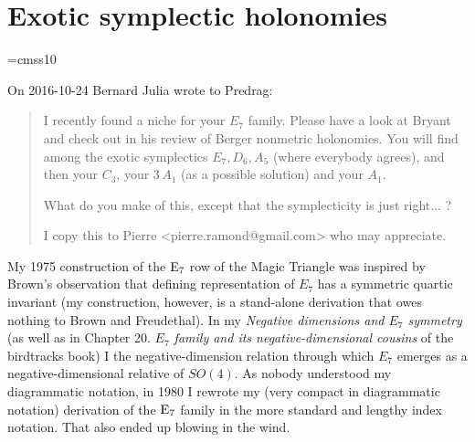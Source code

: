 

\chapter{Exotic symplectic holonomies}
\label{c-holonomies}

\def\Lam{\hbox{\sans\char3}}%
\def\Sym{\hbox{\sans S}}
\def\SO{{\rm SO}}\def\SL{{\rm SL}}
\def\Sp{{\rm Sp}}\def\SU{{\rm SU}}
\def\CO{{\rm CO}}\def\GL{{\rm GL}}
\def\Spin{{\rm Spin}}\def\U{{\rm U}}
\def\A{{\rm A}}\def\C{{\rm C}}\def\D{{\rm D}}
\def\E{{\rm E}}\def\O{{\rm O}}
\def\Diff{{\rm Diff}}\def\G{{\rm G}}
\def\bbC{{\Bbb C}}
\def\bbF{{\Bbb F}}
\def\bbH{{\Bbb H}}
\font\sans=cmss10



On 2016-10-24 Bernard Julia wrote to Predrag:
\begin{quote}
I recently found a niche for your $E_7$ family. Please have a
look at Bryant and check out  in his
review of Berger nonmetric holonomies.
You will find among the exotic symplectics \(E_7, D_6, A_5\) (where everybody
agrees), and then your $C_3$, your $3\,A_1$ (as a possible solution) and your
$A_1$.

What do you make of this, except that the symplecticity is just right... ?

I copy this to Pierre <pierre.ramond@gmail.com> who may appreciate.
\end{quote}

\bigskip

My 1975 construction of the $\E_7$ row of the Magic
Triangle was inspired by Brown's observation that defining
representation of \(E_7\) has a symmetric quartic invariant (my construction,
however, is a stand-alone derivation that owes nothing to Brown and
Freudethal). In my {\em Negative dimensions and $E_7$
symmetry} (as well as in Chapter 20. {\em $E_7$ family and its
negative-dimensional cousins} of the birdtracks book) I the
negative-dimension relation through which $E_7$ emerges as a
negative-dimensional relative of $SO(4)$.
As nobody understood my diagrammatic notation, in 1980 I rewrote my (very
compact in diagrammatic notation) derivation of the $\E_7$ family in the more
standard and lengthy index notation. That also ended up
blowing in the wind.

